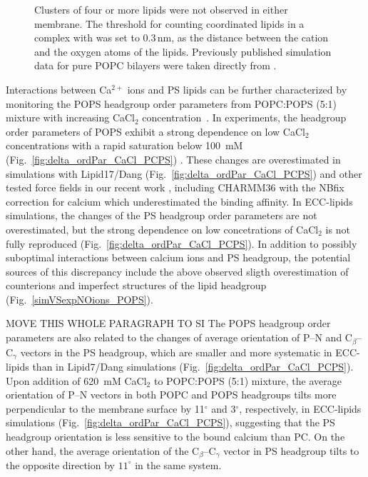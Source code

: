 \documentclass[journal=jpcbfk,manuscript=article]{achemso}
\begin{document}
\begin{figure}[tbp!]
{    %
    Clusters of four or more lipids were not observed in either membrane.
    The threshold for counting coordinated lipids in a complex with  was set to $0.3\,\mathrm{nm}$, 
    as the distance between the cation and the oxygen atoms of the lipids. 
    Previously published simulation data \cite{melcr18} for pure POPC bilayers were taken directly from \cite{ECC-POPC_nacl_cacl2_files}. 
  }
   \\
\end{figure} 

Interactions between Ca$^{2+}$ ions and PS lipids can be further characterized by monitoring
the POPS headgroup order parameters from POPC:POPS (5:1) mixture with increasing  CaCl$_2$ concentration~\cite{roux90}.
In experiments, the headgroup order parameters of POPS exhibit a strong dependence
on low CaCl$_2$ concentrations with a rapid saturation below 100~mM  (Fig.~\ref{fig:delta_ordPar_CaCl_PCPS}) \cite{roux90}.
These changes are overestimated in simulations with Lipid17/Dang (Fig.~\ref{fig:delta_ordPar_CaCl_PCPS})
and other tested force fields in our recent work \cite{NMRlipidsIV}, 
including CHARMM36 with the NBfix correction for calcium
which underestimated the binding affinity.
In ECC-lipids simulations, the changes of the PS headgroup order parameters are not overestimated,
but the strong dependence on low concetrations of CaCl$_2$ is not fully reproduced (Fig.~\ref{fig:delta_ordPar_CaCl_PCPS}).
In addition to possibly suboptimal interactions between calcium ions and PS headgroup, the potential sources of this
discrepancy include the above observed sligth overestimation of  counterions and
imperfect structures of the lipid headgroup (Fig.~\ref{simVSexpNOions_POPS}).

MOVE THIS WHOLE PARAGRAPH TO SI
The POPS headgroup order parameters are also related to the changes of average orientation of P--N and
C$_{\beta}$--C$_{\gamma}$ vectors in the PS headgroup, which are smaller and more systematic
in ECC-lipids than in Lipid7/Dang simulations (Fig.~\ref{fig:delta_ordPar_CaCl_PCPS}).
Upon addition of 620~mM CaCl$_2$ to POPC:POPS (5:1) mixture,
the average orientation of P--N vectors in both POPC and POPS headgroups tilts more perpendicular to the membrane surface
by 11$^\circ$ and  3$^\circ$, respectively, in ECC-lipids simulations (Fig.~\ref{fig:delta_ordPar_CaCl_PCPS}),
suggesting that the PS headgroup orientation is less sensitive to the bound calcium than PC.
On the other hand, the average orientation of the C$_{\beta}$--C$_{\gamma}$ vector in PS headgroup
tilts to the opposite direction by $11^\circ$ in the same system.
\end{document}
